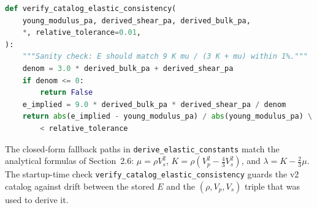 \begin{lstlisting}[language=Python,caption={Derived-quantities module (excerpt)}]
def verify_catalog_elastic_consistency(
    young_modulus_pa, derived_shear_pa, derived_bulk_pa,
    *, relative_tolerance=0.01,
):
    """Sanity check: E should match 9 K mu / (3 K + mu) within 1%."""
    denom = 3.0 * derived_bulk_pa + derived_shear_pa
    if denom <= 0:
        return False
    e_implied = 9.0 * derived_bulk_pa * derived_shear_pa / denom
    return abs(e_implied - young_modulus_pa) / abs(young_modulus_pa) \
        < relative_tolerance
\end{lstlisting}

The closed-form fallback paths in \texttt{derive\_elastic\_constants}
match the analytical formulas of Section~2.6: $\mu = \rho V_s^{2}$,
$K = \rho(V_p^{2} - \tfrac{4}{3} V_s^{2})$, and $\lambda = K -
\tfrac{2}{3}\mu$. The startup-time check
\texttt{verify\_catalog\_elastic\_consistency} guards the v2 catalog
against drift between the stored $E$ and the
$(\rho, V_p, V_s)$ triple that was used to derive it.
